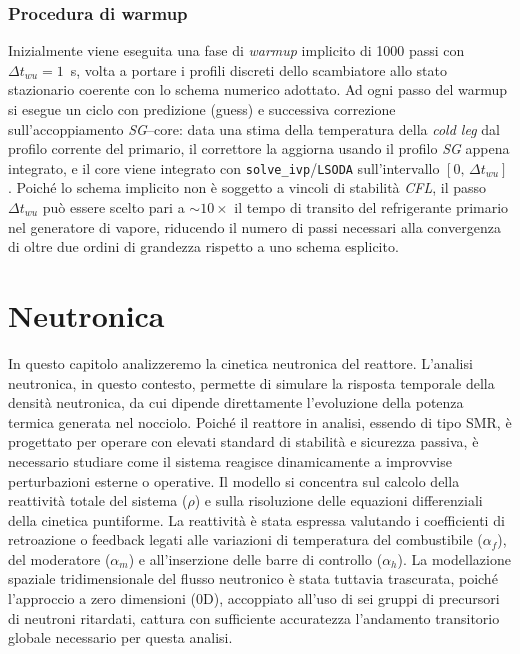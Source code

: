 \documentclass[12pt]{report}
\begin{document}
\subsection{Procedura di warmup}
Inizialmente viene eseguita una fase di \textit{warmup} implicito di 1000 passi con $\Delta t_{wu} = 1$~s, volta a portare i profili discreti dello scambiatore allo stato stazionario coerente con lo schema numerico adottato. Ad ogni passo del warmup si esegue un ciclo con predizione (guess) e successiva correzione sull'accoppiamento \textit{SG}--core: data una stima della temperatura della \textit{cold leg} dal profilo corrente del primario, il correttore la aggiorna usando il profilo \textit{SG} appena integrato, e il core viene integrato con \texttt{solve\_ivp}/\texttt{LSODA} sull'intervallo $[0,\,\Delta t_{wu}]$. Poiché lo schema implicito non è soggetto a vincoli di stabilità \textit{CFL}, il passo $\Delta t_{wu}$ può essere scelto pari a $\sim 10\times$ il tempo di transito del refrigerante primario nel generatore di vapore, riducendo il numero di passi necessari alla convergenza di oltre due ordini di grandezza rispetto a uno schema esplicito.

\chapter{Neutronica}

In questo capitolo analizzeremo la cinetica neutronica del reattore. L'analisi neutronica, in questo contesto, permette di simulare la risposta temporale della densità neutronica, da cui dipende direttamente l'evoluzione della potenza termica generata nel nocciolo. Poiché il reattore in analisi, essendo di tipo SMR, è progettato per operare con elevati standard di stabilità e sicurezza passiva, è necessario studiare come il sistema reagisce dinamicamente a improvvise perturbazioni esterne o operative. Il modello si concentra sul calcolo della reattività totale del sistema ($\rho$) e sulla risoluzione delle equazioni differenziali della cinetica puntiforme. La reattività è stata espressa valutando i coefficienti di retroazione o feedback legati alle variazioni di temperatura del combustibile ($\alpha_f$), del moderatore ($\alpha_m$) e all'inserzione delle barre di controllo ($\alpha_h$). La modellazione spaziale tridimensionale del flusso neutronico è stata tuttavia trascurata, poiché l'approccio a zero dimensioni (0D), accoppiato all'uso di sei gruppi di precursori di neutroni ritardati, cattura con sufficiente accuratezza l'andamento transitorio globale necessario per questa analisi.
\end{document}
